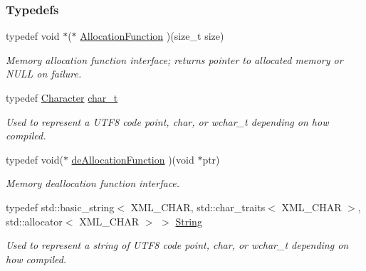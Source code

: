 \subsubsection*{Typedefs}
\begin{DoxyCompactItemize}
\item 
\hypertarget{namespaceMezzanine_1_1xml_a63e924e0606b9268d2ac756d9b453e76}{
typedef void $\ast$($\ast$ \hyperlink{namespaceMezzanine_1_1xml_a63e924e0606b9268d2ac756d9b453e76}{AllocationFunction} )(size\_\-t size)}
\label{namespaceMezzanine_1_1xml_a63e924e0606b9268d2ac756d9b453e76}

\begin{DoxyCompactList}\small\item\em Memory allocation function interface; returns pointer to allocated memory or NULL on failure. \item\end{DoxyCompactList}\item 
typedef \hyperlink{namespaceMezzanine_ad5147a419db7627ee552a2b582f1052d}{Character} \hyperlink{namespaceMezzanine_1_1xml_a29b8a47c179e9895c4e9e66c45d1dbbc}{char\_\-t}
\begin{DoxyCompactList}\small\item\em Used to represent a UTF8 code point, char, or wchar\_\-t depending on how compiled. \item\end{DoxyCompactList}\item 
\hypertarget{namespaceMezzanine_1_1xml_ab6e6202dc17fc372cddce061a45812d1}{
typedef void($\ast$ \hyperlink{namespaceMezzanine_1_1xml_ab6e6202dc17fc372cddce061a45812d1}{deAllocationFunction} )(void $\ast$ptr)}
\label{namespaceMezzanine_1_1xml_ab6e6202dc17fc372cddce061a45812d1}

\begin{DoxyCompactList}\small\item\em Memory deallocation function interface. \item\end{DoxyCompactList}\item 
typedef std::basic\_\-string$<$ XML\_\-CHAR, std::char\_\-traits$<$ XML\_\-CHAR $>$, std::allocator$<$ XML\_\-CHAR $>$ $>$ \hyperlink{namespaceMezzanine_1_1xml_a3ddf35656ecc38b6fa1d0364d9ad3b2c}{String}
\begin{DoxyCompactList}\small\item\em Used to represent a string of UTF8 code point, char, or wchar\_\-t depending on how compiled. \item\end{DoxyCompactList}\end{DoxyCompactItemize}
